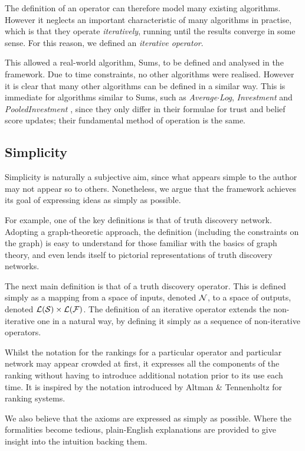\documentclass[../main.tex]{subfiles}
\begin{document}
The definition of an operator can therefore model many existing algorithms.
However it neglects an important characteristic of many algorithms in practise,
which is that they operate \emph{iteratively}, running until the results
converge in some sense. For this reason, we defined an \emph{iterative
operator}.

This allowed a real-world algorithm, Sums, to be defined and analysed in the
framework. Due to time constraints, no other algorithms were realised. However
it is clear that many other algorithms can be defined in a similar way. This
is immediate for algorithms similar to Sums, such as \emph{Average$\cdot$Log},
\emph{Investment} and \emph{PooledInvestment} \cite{pasternack}, since they
only differ in their formulae for trust and belief score updates; their
fundamental method of operation is the same.

\subsection*{Simplicity}

Simplicity is naturally a subjective aim, since what appears simple to the
author may not appear so to others. Nonetheless, we argue that the framework
achieves its goal of expressing ideas as simply as possible.

For example, one of the key definitions is that of truth discovery network.
Adopting a graph-theoretic approach, the definition (including the constraints
on the graph) is easy to understand for those familiar with the basics of graph
theory, and even lends itself to pictorial representations of truth discovery
networks.

The next main definition is that of a truth discovery operator. This is defined
simply as a mapping from a space of inputs, denoted $\mathcal{N}$, to a space of
outputs, denoted $\mathcal{L}(\mathcal{S}) \times \mathcal{L}(\mathcal{F})$. The definition of an
iterative operator extends the non-iterative one in a natural way, by defining
it simply as a sequence of non-iterative operators.

Whilst the notation for the rankings for a particular operator and particular
network may appear crowded at first, it expresses all the components of the
ranking without having to introduce additional notation prior to its use each
time. It is inspired by the notation introduced by Altman \& Tennenholtz
\cite{altman_foundations} for ranking systems.

We also believe that the axioms are expressed as simply as possible. Where the
formalities become tedious, plain-English explanations are provided to give
insight into the intuition backing them.
\end{document}
